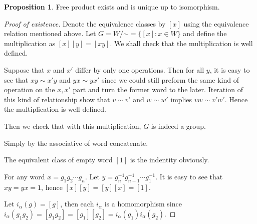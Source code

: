 \documentclass[a4paper,titlepage]{article}
\theoremstyle{remark}
\theoremstyle{definition}
\theoremstyle{theorem}
\newtheorem{proposition}{Proposition}
\begin{document}
  \begin{proposition}
    Free product exists and is unique up to isomorphism.
  \end{proposition}

  \begin{proof}[Proof of existence]
    Denote the equivalence classes by $[x]$ using the equivalence relation mentioned above.
    Let $G = W\!/\mathord\sim = \{ [x] : x \in W \}$ and define the multiplication as 
    $[x][y] = [xy]$. We shall check that the multiplication is well defined.

    Suppose that $x$ and $x'$ differ by only one operations. Then for all $y$, it is easy to 
    see that $xy \sim x'y$ and $yx \sim yx'$ since we could still preform the same kind of 
    operation on the $x, x'$ part and turn the former word to the later. Iteration of this
    kind of relationship show that $v \sim v'$ and $w \sim w'$ implies $vw \sim v'w'$. Hence 
    the multiplication is well defined.

    Then we check that with this multiplication, $G$ is indeed a group.
    \begin{description}[style=standard]
      \item[associative:] Simply by the associative of word concatenate.
      \item[indentity:] The equivalent class of empty word $[1]$ is the indentity obviously.
      \item[inverse:] For any word $x = g_1 g_2 \cdots g_n$. Let $y = g^{-1}_n g^{-1}_{n-1} \cdots g^{-1}_1$.
        It is easy to see that $xy = yx = 1$, hence $[x][y] = [y][x] = [1]$.
    \end{description}
    Let $i_\alpha(g) = [g]$, then each $i_\alpha$ is a homomorphism since $i_\alpha(g_1 g_2) = [g_1 g_2]
    = [g_1] [g_2] = i_\alpha(g_1) i_\alpha(g_2)$.


\end{proof}
\end{document}
